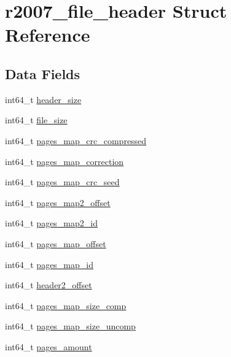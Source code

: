 \hypertarget{structr2007__file__header}{\section{r2007\-\_\-file\-\_\-header \-Struct \-Reference}
\label{structr2007__file__header}
}
\subsection*{\-Data \-Fields}
\begin{DoxyCompactItemize}
\item 
int64\-\_\-t \hyperlink{structr2007__file__header_a063c396bc010bf5af11d0f1bc3dd95bf}{header\-\_\-size}
\item 
int64\-\_\-t \hyperlink{structr2007__file__header_a175d522088e44b31968fab84e6bd3b27}{file\-\_\-size}
\item 
int64\-\_\-t \hyperlink{structr2007__file__header_ad5c733692cc617e63b272b548a35a4dc}{pages\-\_\-map\-\_\-crc\-\_\-compressed}
\item 
int64\-\_\-t \hyperlink{structr2007__file__header_afa704c56642addf74bacccbb0ae27934}{pages\-\_\-map\-\_\-correction}
\item 
int64\-\_\-t \hyperlink{structr2007__file__header_abf3c615cb88ade9bffd6923f260e0090}{pages\-\_\-map\-\_\-crc\-\_\-seed}
\item 
int64\-\_\-t \hyperlink{structr2007__file__header_abc17c042036e251544e4c22b6675015a}{pages\-\_\-map2\-\_\-offset}
\item 
int64\-\_\-t \hyperlink{structr2007__file__header_a9648e2230c2bdf174b7e3b80ada2d42b}{pages\-\_\-map2\-\_\-id}
\item 
int64\-\_\-t \hyperlink{structr2007__file__header_a4a88909bea117204572e4bd06ec34c33}{pages\-\_\-map\-\_\-offset}
\item 
int64\-\_\-t \hyperlink{structr2007__file__header_aa3c25e8f1123c39ed33ebd4011e7dce4}{pages\-\_\-map\-\_\-id}
\item 
int64\-\_\-t \hyperlink{structr2007__file__header_a26269150a580d48ba0c1c8426c5d0c24}{header2\-\_\-offset}
\item 
int64\-\_\-t \hyperlink{structr2007__file__header_a52f1ef9cc8be3b9218029b65af0d7b32}{pages\-\_\-map\-\_\-size\-\_\-comp}
\item 
int64\-\_\-t \hyperlink{structr2007__file__header_a596d98c422e2d4e887d0c6f3db94ed9e}{pages\-\_\-map\-\_\-size\-\_\-uncomp}
\item 
int64\-\_\-t \hyperlink{structr2007__file__header_adb0ea521907b1f18956188f10bb47054}{pages\-\_\-amount}

\end{DoxyCompactItemize}
